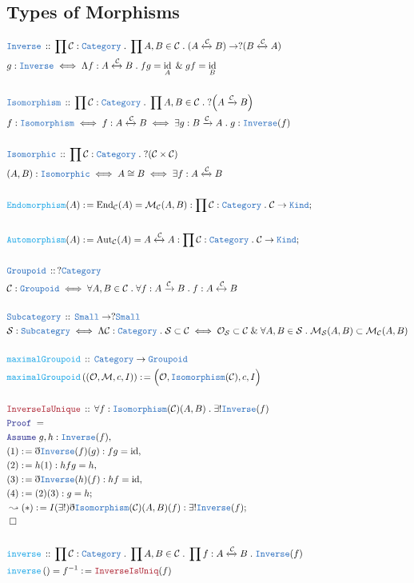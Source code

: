 \documentclass[12pt]{scrartcl}
\newcommand{\TYPE}[1]{\textcolor{NavyBlue}{\mathtt{#1}}}
\newcommand{\FUNC}[1]{\textcolor{Cerulean}{\mathtt{#1}}}
\newcommand{\LOGIC}[1]{\textcolor{Blue}{\mathtt{#1}}}
\newcommand{\THM}[1]{\textcolor{Maroon}{\mathtt{#1}}}
\renewcommand{\.}{\; . \;}
\newcommand{\de}{: \kern 0.1pc =}
\newcommand{\Act}[1]{\left( #1 \right)}
\newcommand{\Theorem}[2]{& \THM{#1} \, :: \, #2 \\ & \Proof = \\ }
\newcommand{\DeclareType}[2]{& \TYPE{#1} \, :: \, #2 \\}
\newcommand{\DefineType}[3]{& #1 : \TYPE{#2} \iff #3 \\}
\newcommand{\DefineNamedType}[4]{& #1 : \TYPE{#2} \iff #3 \iff #4 \\}
\newcommand{\DeclareFunc}[2]{& \FUNC{#1} \, :: \, #2 \\}
\newcommand{\DefineFunc}[3]{&  \FUNC{#1}\Act{#2} \de #3 \\}
\newcommand{\DefineNamedFunc}[4]{&  \FUNC{#1}\Act{#2} = #3 \de #4 \\}
\newcommand{\Page}[1]{ \begin{align*} #1 \end{align*}   }
\newcommand{ \bd }{ \ByDef }
\renewcommand{\And}{\; \& \;}
\newcommand{\Class}{\TYPE{Kind}}
\DeclareMathOperator*{\id}{id}
\newcommand{\Cat}{\TYPE{Category}}
\newcommand{\Mor}{\mathcal{M}}
\newcommand{\Obj}{\mathcal{O}}
\newcommand{\Endo}{\mathrm{End}}
\newcommand{\Aut}{\mathrm{Aut}}
\newcommand{\ToIso}{\xleftrightarrow}
\newcommand{\Say}[3]{& #1 \de #2 : #3, \\}
\newcommand{\Conclude}[3]{& #1 \de #2 : #3; \\}
\newcommand{\DeriveConclude}[3]{& \leadsto #1 \de #2 : #3 ; \\}
\newcommand{\Assume}[2]{& \LOGIC{Assume} \; #1 : #2, \\}
\newcommand{\QED}{\; \square}
\newcommand{\EndProof}{& \QED \\}
\newcommand{\ByDef}{\eth}
\newcommand{\Proof}{\LOGIC{Proof} \; }
\newcommand{\C}{\mathcal{C}}
\begin{document}
\subsection{Types of Morphisms}
\Page{
	\DeclareType{Inverse}{\prod \C : \Cat \. \prod A, B \in \C \. (A \xleftrightarrow{\C} B) \to 
		?(B \xleftrightarrow{\C} A) }
	\DefineType{g}{Inverse}{\Lambda f : A \xleftrightarrow{\C} B \. fg = \id_{A} \And gf = \id_{B} }
	\\
	\DeclareType{Isomorphism}{\prod \C : \Cat \. \prod  A, B \in \C \. ?\Big(A \xrightarrow{\C} B\Big) }
	\DefineNamedType{f}{ Isomorphism  }{f : A \xleftrightarrow{\C} B}
	{ \exists g : B \xrightarrow{\C} A \.  g : \TYPE{Inverse}(f) }
	\\
	\DeclareType{Isomorphic}{\prod \C : \Cat \.   ?( \C \times \C )   }
	\DefineNamedType{(A,B)}{Isomorphic}{A \cong B}{\exists f  : A \xleftrightarrow{\C} B }
	\\
	\Conclude{\FUNC{Endomorphism}(A)}{  \Endo_{\C}(A) = \mathcal{M}_{\C}(A,B)  }{  \prod \C : \Cat \.  \C  \to \Class }
	\\
	\Conclude{\FUNC{Automorphism}(A)}{ \Aut_{\C}(A) =  A \xleftrightarrow{\C} A   }{\prod \C : \Cat \. \C \to \Class}
	\\
	\DeclareType{Groupoid}{ ? \Cat}
	\DefineType{\C}{Groupoid}{\forall A,B \in \C \. \forall f : A \xrightarrow{\C} B \. f : A \xleftrightarrow{\C} B  }
	\\
	\DeclareType{Subcategory}{\TYPE{Small} \to ?\TYPE{Small}}
	\DefineNamedType{\mathcal{S}}{Subcategry}{\Lambda \C : \Cat \. \mathcal{S} \subset \C}{ 
		\Obj_{\mathcal{S}} \subset \C \And \forall A,B \in \mathcal{S} \.  
		\Mor_{\mathcal{S}}(A,B) \subset  \Mor_{\C}(A,B)    }
	\\
	\DeclareFunc{maximalGroupoid}{\Cat \to \TYPE{Groupoid}}
	\DefineFunc{maximalGroupoid}{ (\Obj,\Mor,c,I) }{ \Big( \Obj, \TYPE{Isomorphism}(\mathcal{C}),c, I \Big) }
	\\
	\Theorem{InverseIsUnique}{ \forall f : \TYPE{Isomorphism}(\C)(A,B) \. 
		\exists! \TYPE{Inverse}(f)   }
	\Assume{g,h}{ \TYPE{Inverse}(f)  }
	\Say{(1)}{\bd \TYPE{Inverse}(f)(g)}{ fg = \id }
	\Say{(2)}{ h(1) }{hfg = h}
	\Say{(3)}{\bd \TYPE{Inverse}(h)(f)}{ hf = \id }
	\Conclude{(4)}{(2)(3)}{ g = h }
	\DeriveConclude{(*)}{I(\exists!)\bd \TYPE{Isomorphism}(\C)(A,B)(f)}{\exists! \TYPE{Inverse}(f)}
	\EndProof
	\\
	\DeclareFunc{inverse}{\prod \C : \Cat \. \prod A,B \in \C \. \prod f : A \ToIso{\C} B \. \TYPE{Inverse}(f)}
	\DefineNamedFunc{inverse}{}{f^{-1}}{ \THM{InverseIsUniq}(f)  }
}
\end{document}
